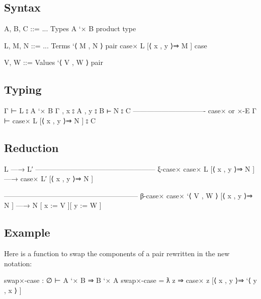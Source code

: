 \hypertarget{syntax-3}{%
\subsection{Syntax}\label{syntax-3}}

\begin{myDisplay}
A, B, C ::= ...                     Types
  A `× B                              product type

L, M, N ::= ...                     Terms
  `⟨ M , N ⟩                          pair
  case× L [⟨ x , y ⟩⇒ M ]             case

V, W ::=                            Values
  `⟨ V , W ⟩                          pair
\end{myDisplay}

\hypertarget{typing-3}{%
\subsection{Typing}\label{typing-3}}

\begin{myDisplay}
Γ ⊢ L ⦂ A `× B
Γ , x ⦂ A , y ⦂ B ⊢ N ⦂ C
------------------------------- case× or ×-E
Γ ⊢ case× L [⟨ x , y ⟩⇒ N ] ⦂ C
\end{myDisplay}

\hypertarget{reduction-3}{%
\subsection{Reduction}\label{reduction-3}}

\begin{myDisplay}
L —→ L′
--------------------------------------------------- ξ-case×
case× L [⟨ x , y ⟩⇒ N ] —→ case× L′ [⟨ x , y ⟩⇒ N ]

--------------------------------------------------------- β-case×
case× `⟨ V , W ⟩ [⟨ x , y ⟩⇒ N ] —→ N [ x := V ][ y := W ]
\end{myDisplay}

\hypertarget{example-3}{%
\subsection{Example}\label{example-3}}

Here is a function to swap the components of a pair rewritten in the new
notation:

\begin{myDisplay}
swap×-case : ∅ ⊢ A `× B ⇒ B `× A
swap×-case = ƛ z ⇒ case× z
                     [⟨ x , y ⟩⇒ `⟨ y , x ⟩ ]
\end{myDisplay}

